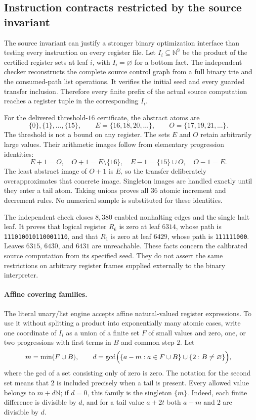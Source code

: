 \subsection{Instruction contracts restricted by the source invariant}

The source invariant can justify a stronger binary optimization interface than
testing every instruction on every register file.  Let $I_i\subseteq\mathbb N^9$
be the product of the certified register sets at leaf $i$, with $I_i=\varnothing$
for a bottom fact.  The independent checker reconstructs the complete source
control graph from a full binary trie and the consumed-path list operations.
It verifies the initial seed and every guarded transfer inclusion.  Therefore
every finite prefix of the actual source computation reaches a register tuple
in the corresponding $I_i$.

For the delivered threshold-$16$ certificate, the abstract atoms are
\[
 \{0\},\{1\},\ldots,\{15\},\qquad
 E=\{16,18,20,\ldots\},\qquad
 O=\{17,19,21,\ldots\}.
\]
The threshold is not a bound on any register.  The sets $E$ and $O$ retain
arbitrarily large values.  Their arithmetic images follow from elementary
progression identities:
\[
 E+1=O,\quad O+1=E\setminus\{16\},\quad
 E-1=\{15\}\cup O,\quad O-1=E.
\]
The least abstract image of $O+1$ is $E$, so the transfer deliberately
overapproximates that concrete image.  Singleton images are handled exactly
until they enter a tail atom.  Taking unions proves all $36$ atomic increment
and decrement rules.  No numerical sample is substituted for these identities.

The independent check closes $8{,}380$ enabled nonhalting edges and the single
halt leaf.  It proves that logical register $R_6$ is zero at leaf $6314$, whose
path is \texttt{111010010110001110}, and that $R_1$ is zero at leaf $6429$,
whose path is \texttt{111111000}.  Leaves $6315$, $6430$, and $6431$ are
unreachable.  These facts concern the calibrated source computation from its
specified seed.  They do not assert the same restrictions on arbitrary
register frames supplied externally to the binary interpreter.

\paragraph{Affine covering families.}
The literal unary/list engine accepts affine natural-valued register
expressions.  To use it without splitting a product into exponentially many
atomic cases, write one coordinate of $I_i$ as a union of a finite set $F$ of
small values and zero, one, or two progressions with first terms in $B$ and
common step $2$.  Let
\[
 m=\min(F\cup B),\qquad
 d=\gcd\Bigl(\{a-m:a\in F\cup B\}
       \cup\{2:B\ne\varnothing\}\Bigr),
\]
where the gcd of a set consisting only of zero is zero.  The notation for the
second set means that $2$ is included precisely when a tail is present.
Every allowed value belongs to $m+d\mathbb N$; if $d=0$, this family is the
singleton $\{m\}$.  Indeed, each finite difference is divisible by $d$, and
for a tail value $a+2t$ both $a-m$ and $2$ are divisible by $d$.

